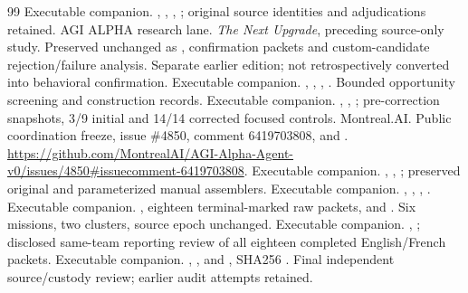 \documentclass[11pt,a4paper]{article}
\begin{document}
\begin{thebibliography}{99}
 Executable companion. , , , ; original source identities and adjudications retained.
 AGI ALPHA research lane. \emph{The Next Upgrade}, preceding source-only study. Preserved unchanged as , confirmation packets and custom-candidate rejection/failure analysis. Separate earlier edition; not retrospectively converted into behavioral confirmation.
 Executable companion. , , , . Bounded opportunity screening and construction records.
 Executable companion. , , ; pre-correction snapshots, 3/9 initial and 14/14 corrected focused controls.
 Montreal.AI. Public coordination freeze, issue \#4850, comment 6419703808, and . \url{https://github.com/MontrealAI/AGI-Alpha-Agent-v0/issues/4850#issuecomment-6419703808}.
 Executable companion. , , ; preserved original and parameterized manual assemblers.
 Executable companion. , , , .
 Executable companion. , eighteen terminal-marked raw packets, and . Six missions, two clusters, source epoch unchanged.
 Executable companion. , ; disclosed same-team reporting review of all eighteen completed English/French packets.
 Executable companion. , , and , SHA256 . Final independent source/custody review; earlier audit attempts retained.

\end{thebibliography}
\end{document}
